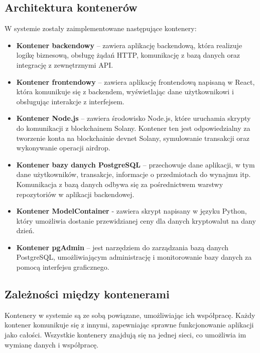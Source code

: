 \subsection{Architektura kontenerów}
W systemie zostały zaimplementowane następujące kontenery:
\begin{itemize}
    \item \textbf{Kontener backendowy} – zawiera aplikację backendową, która realizuje logikę biznesową, obsługę żądań HTTP, komunikację z bazą danych oraz integrację z zewnętrznymi API.
    \item \textbf{Kontener frontendowy} – zawiera aplikację frontendową napisaną w React, która komunikuje się z backendem, wyświetlając dane użytkownikowi i obsługując interakcje z interfejsem.
    \item \textbf{Kontener Node.js} – zawiera środowisko Node.js, które uruchamia skrypty do komunikacji z blockchainem Solany. Kontener ten jest odpowiedzialny za tworzenie konta na blockchainie devnet Solany, symulowanie transakcji oraz wykonywanie operacji airdrop.
    \item \textbf{Kontener bazy danych PostgreSQL} – przechowuje dane aplikacji, w tym dane użytkowników, transakcje, informacje o przedmiotach do wynajmu itp. Komunikacja z bazą danych odbywa się za pośrednictwem warstwy repozytoriów w aplikacji backendowej.
		\item \textbf{Kontener ModelContainer} - zawiera skrypt napisany w języku Python, który umożliwia dostanie przewidzianej ceny dla danych kryptowalut na dany dzień.
    \item \textbf{Kontener pgAdmin} – jest narzędziem do zarządzania bazą danych PostgreSQL, umożliwiającym administrację i monitorowanie bazy danych za pomocą interfejsu graficznego.
\end{itemize}

\subsection{Zależności między kontenerami}
Kontenery w systemie są ze sobą powiązane, umożliwiając ich współpracę. Każdy kontener komunikuje się z innymi, zapewniając sprawne funkcjonowanie aplikacji jako całości. Wszystkie kontenery znajdują się na jednej sieci, co umożliwia im wymianę danych i współpracę. 


